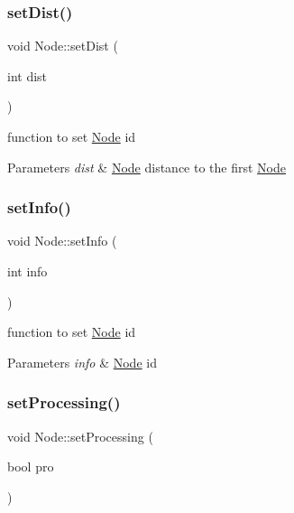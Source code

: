 \subsubsection{\texorpdfstring{set\+Dist()}{setDist()}}
{\footnotesize\ttfamily void Node\+::set\+Dist (\begin{DoxyParamCaption}\item[{int}]{dist }\end{DoxyParamCaption})}



function to set \hyperlink{class_node}{Node} id 


\begin{DoxyParams}{Parameters}
{\em dist} & \hyperlink{class_node}{Node} distance to the first \hyperlink{class_node}{Node} \\
\hline
\end{DoxyParams}
\mbox{\label{class_node_a877cee0d253352080b00c2441f271dde}} 
\subsubsection{\texorpdfstring{set\+Info()}{setInfo()}}
{\footnotesize\ttfamily void Node\+::set\+Info (\begin{DoxyParamCaption}\item[{int}]{info }\end{DoxyParamCaption})}



function to set \hyperlink{class_node}{Node} id 


\begin{DoxyParams}{Parameters}
{\em info} & \hyperlink{class_node}{Node} id \\
\hline
\end{DoxyParams}
\mbox{\label{class_node_afe1cac7d39ccadd907caa67013891fb6}} 
\subsubsection{\texorpdfstring{set\+Processing()}{setProcessing()}}
{\footnotesize\ttfamily void Node\+::set\+Processing (\begin{DoxyParamCaption}\item[{bool}]{pro }\end{DoxyParamCaption})}



